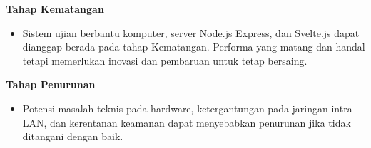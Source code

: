 \documentclass[12pt]{article}
\begin{document}
\textbf{Tahap Kematangan}
\begin{itemize}
  \item Sistem ujian berbantu komputer, server Node.js Express, dan Svelte.js dapat dianggap berada pada tahap Kematangan. Performa yang matang dan handal tetapi memerlukan inovasi dan pembaruan untuk tetap bersaing.
\end{itemize}

\textbf{Tahap Penurunan}
\begin{itemize}
  \item Potensi masalah teknis pada hardware, ketergantungan pada jaringan intra LAN, dan kerentanan keamanan dapat menyebabkan penurunan jika tidak ditangani dengan baik.
\end{itemize}
\newpage




\end{document}
